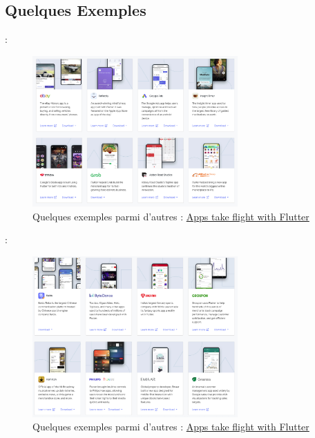 \documentclass[10pt]{beamer}
\begin{document}
\subsection{Quelques Exemples}
\begin{frame}[fragile,t]{\secname : \subsecname}
    \begin{figure}[H]
        \begin{center}
            \includegraphics[width=0.7\textwidth]{../assets/img/exemples.jpg}
            \caption*{Quelques exemples parmi d'autres : \href{https://flutter.dev/showcase}{Apps take flight with Flutter}}
            \label{Fig:exemples}
        \end{center}
    \end{figure}
\end{frame}

\begin{frame}[fragile,t]{\secname : \subsecname}
    \begin{figure}[H]
        \begin{center}
            \includegraphics[width=0.7\textwidth]{../assets/img/exemples2.jpg}
            \caption*{Quelques exemples parmi d'autres : \href{https://flutter.dev/showcase}{Apps take flight with Flutter}}
            \label{Fig:exemples2}
        \end{center}
    \end{figure}
\end{frame}
\end{document}
